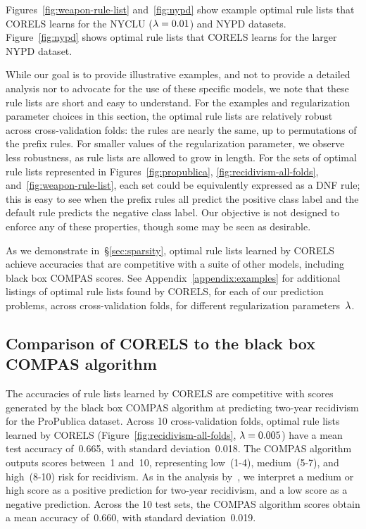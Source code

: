 Figures~\ref{fig:weapon-rule-list} and~\ref{fig:nypd} show example optimal rule lists that
CORELS learns for the NYCLU (${{\lambda} = 0.01}$) and NYPD datasets.
%
Figure~\ref{fig:nypd} shows optimal rule lists that CORELS learns for the larger NYPD dataset.
%

While our goal is to provide illustrative examples, and not to provide a
detailed analysis nor to advocate for the use of these specific models,
we note that these rule lists are short and easy to understand.
%
For the examples and regularization parameter choices in this section,
the optimal rule lists are relatively robust across cross-validation folds:
the rules are nearly the same, up to permutations of the prefix rules.
%
For smaller values of the regularization parameter, we observe less robustness,
as rule lists are allowed to grow in length.
%
For the sets of optimal rule lists represented in Figures~\ref{fig:propublica},
\ref{fig:recidivism-all-folds}, and~\ref{fig:weapon-rule-list},
each set could be equivalently expressed as a DNF rule;
\eg this is easy to see when the prefix rules all predict the positive class label
and the default rule predicts the negative class label.
%
Our objective is not designed to enforce any of these properties,
though some may be seen as desirable.
%

As we demonstrate in~\S\ref{sec:sparsity},
optimal rule lists learned by CORELS achieve accuracies that are competitive
with a suite of other models, including black box COMPAS scores.
%
See Appendix~\ref{appendix:examples} for additional listings of optimal rule lists found
by CORELS, for each of our prediction problems, across cross-validation folds,
for different regularization parameters~${\lambda}$.

\subsection{Comparison of CORELS to the black box COMPAS algorithm}
\label{sec:compas}

The accuracies of rule lists learned by CORELS are competitive with
scores generated by the black box COMPAS algorithm
at predicting two-year recidivism for the ProPublica dataset.
%
Across 10 cross-validation folds, optimal rule lists learned by CORELS
(Figure~\ref{fig:recidivism-all-folds}, ${{\lambda} = 0.005}$)
have a mean test accuracy of~0.665, with standard deviation~0.018.
%
The COMPAS algorithm outputs scores between~1 and~10,
representing low~(1-4), medium~(5-7), and high~(8-10) risk for recidivism.
%
As in the analysis by~\citep{LarsonMaKiAn16}, we interpret a medium or high score
as a positive prediction for two-year recidivism, and a low score as a negative prediction.
%
Across the 10 test sets, the COMPAS algorithm scores obtain
a mean accuracy of~0.660, with standard deviation~0.019.

